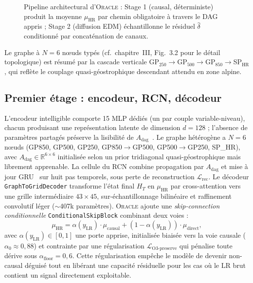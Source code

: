 \documentclass[14pt,a4paper,openany]{extreport}
\newcommand{\Oracle}{\textsc{Oracle}}
\newcommand{\HR}{\ensuremath{\text{HR}}}
\newcommand{\LR}{\ensuremath{\text{LR}}}
\newcommand{\muHR}{\ensuremath{\mu_{\HR}}}
\newcommand{\Adag}{\ensuremath{A_{\mathrm{dag}}}}
\newcommand{\HT}{\ensuremath{H_T}}
\newcommand{\yLR}{\ensuremath{y_{\LR}}}
\begin{document}
\begin{figure}[H]
{%
}
\caption[Pipeline architectural d'Oracle]{Pipeline architectural d'\Oracle{} : Stage 1 (causal, déterministe) produit la moyenne $\muHR$ par chemin obligatoire à travers le DAG appris ; Stage 2 (diffusion EDM) échantillonne le résiduel $\widehat\delta$ conditionné par concaténation de canaux.}
\label{fig:exp-architecture}
\end{figure}

Le graphe à $N=6$ n\oe uds typés (cf.~chapitre~III, Fig.~3.2 pour le détail topologique) est résumé par la cascade verticale GP$_{250}\!\to\!$GP$_{500}\!\to\!$GP$_{850}\!\to\!$SP$_{\HR}$, qui reflète le couplage quasi-géostrophique descendant attendu en zone alpine.

\subsection{Premier étage : encodeur, RCN, décodeur}
\label{ssec:exp-topo-stage1}

L'encodeur intelligible comporte 15 MLP dédiés (un par couple variable-niveau), chacun produisant une représentation latente de dimension $d = 128$ ; l'absence de paramètres partagés préserve la lisibilité de $\Adag$~\cite{bello_dagma_2022}. Le graphe hétérogène a $N = 6$ nœuds (GP850, GP500, GP250, GP850$\to$GP500, GP500$\to$GP250, SP\_HR), avec $\Adag \in \mathbb{R}^{6 \times 6}$ initialisée selon un prior tridiagonal quasi-géostrophique mais librement apprenable. La cellule du RCN combine propagation par $\Adag$ et mise à jour GRU~\cite{cho_gru_2014} sur huit pas temporels, sous perte de reconstruction $\mathcal{L}_{\mathrm{rec}}$. Le décodeur \texttt{GraphToGridDecoder} transforme l'état final $\HT$ en $\muHR$ par cross-attention vers une grille intermédiaire $43 \times 45$, sur-échantillonnage bilinéaire et raffinement convolutif léger ($\sim$407k paramètres). \Oracle{} ajoute une \emph{skip-connection conditionnelle} \texttt{ConditionalSkipBlock} combinant deux voies :
\begin{equation}
  \muHR = \alpha(\yLR) \cdot \mu_{\mathrm{causal}} + (1 - \alpha(\yLR)) \cdot \mu_{\mathrm{direct}},
  \label{eq:exp-skip}
\end{equation}
avec $\alpha(\yLR) \in [0, 1]$ une porte apprise, initialisée biaisée vers la voie causale ($\alpha_0 \approx 0{,}88$) et contrainte par une régularisation $\mathcal{L}_{\mathrm{O3\text{-}preserve}}$ qui pénalise toute dérive sous $\alpha_{\mathrm{floor}} = 0{,}6$. Cette régularisation empêche le modèle de devenir non-causal déguisé tout en libérant une capacité résiduelle pour les cas où le \LR{} brut contient un signal directement exploitable.
\end{document}
